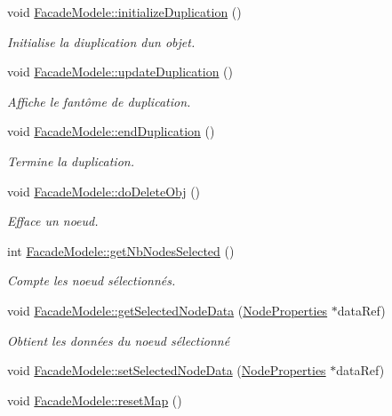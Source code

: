 \begin{DoxyCompactItemize}
void \hyperlink{group__inf2990_ga6f50ec221ffc9a37a80fc87b9241000e}{Facade\+Modele\+::initialize\+Duplication} ()
\begin{DoxyCompactList}\small\item\em Initialise la diuplication d\textquotesingle{}un objet. \end{DoxyCompactList}\item 
void \hyperlink{group__inf2990_ga1a3e0ca25ffb4442968ce0977ca37d45}{Facade\+Modele\+::update\+Duplication} ()
\begin{DoxyCompactList}\small\item\em Affiche le fantôme de duplication. \end{DoxyCompactList}\item 
void \hyperlink{group__inf2990_ga236c0dba051c913078932ea1cf4a2e76}{Facade\+Modele\+::end\+Duplication} ()
\begin{DoxyCompactList}\small\item\em Termine la duplication. \end{DoxyCompactList}\item 
void \hyperlink{group__inf2990_gaa41bbec7d5381099ca3b945b6ed2675f}{Facade\+Modele\+::do\+Delete\+Obj} ()
\begin{DoxyCompactList}\small\item\em Efface un noeud. \end{DoxyCompactList}\item 
int \hyperlink{group__inf2990_gac85e226dae7761e7e98e0df151c5a766}{Facade\+Modele\+::get\+Nb\+Nodes\+Selected} ()
\begin{DoxyCompactList}\small\item\em Compte les noeud sélectionnés. \end{DoxyCompactList}\item 
void \hyperlink{group__inf2990_ga7dfe6c0df984dd4d2c5402d9fab0fc75}{Facade\+Modele\+::get\+Selected\+Node\+Data} (\hyperlink{struct_node_properties}{Node\+Properties} $\ast$data\+Ref)
\begin{DoxyCompactList}\small\item\em Obtient les données du noeud sélectionné \end{DoxyCompactList}\item 
void \hyperlink{group__inf2990_gae40b907a6c30f55176cde6b1736eaf72}{Facade\+Modele\+::set\+Selected\+Node\+Data} (\hyperlink{struct_node_properties}{Node\+Properties} $\ast$data\+Ref)
\item 
void \hyperlink{group__inf2990_gace5ff9435d6bcf501298d401207733bf}{Facade\+Modele\+::reset\+Map} ()

\end{DoxyCompactItemize}
